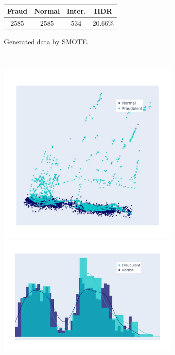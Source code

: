 \begin{figure}[h!]
\begin{subfigure}[]{0.3\linewidth}
		\begin{tabular}{c|c|c|c}
			Fraud & Normal & Inter. & HDR  \\
			\hline
			2585  & 2585  & 534 & 20.66\(\%\) \\
		\end{tabular}
		\caption{Generated data by SMOTE. }
		\label{fig:SMOTE_hist}
	\end{subfigure}
	\\ 
	\begin{subfigure}[]{0.3\linewidth}	
		\includegraphics[width=\linewidth,trim=40 40 40 40,clip]{Figures/creditcard/PCA/ADASYN-data-run-0-0}
		\includegraphics[width=\linewidth,trim=40 40 40 40,clip]{Figures/creditcard/PCA/ADASYN-data-run-0-0_DIST}

\end{subfigure}
\end{figure}
